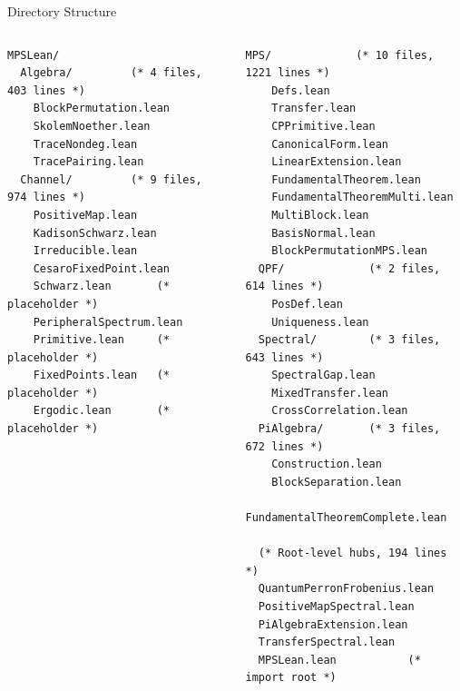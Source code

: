 \documentclass[aspectratio=169,10pt]{beamer}
\begin{document}
\begin{frame}[fragile]{Directory Structure}
    \vspace{-0.3em}
    \begin{columns}[T]
        \begin{lstlisting}[basicstyle=\ttfamily\tiny\color{white},frame=none,backgroundcolor=\color{cardbg}]
MPSLean/
  Algebra/         (* 4 files, 403 lines *)
    BlockPermutation.lean
    SkolemNoether.lean
    TraceNondeg.lean
    TracePairing.lean
  Channel/         (* 9 files, 974 lines *)
    PositiveMap.lean
    KadisonSchwarz.lean
    Irreducible.lean
    CesaroFixedPoint.lean
    Schwarz.lean       (* placeholder *)
    PeripheralSpectrum.lean
    Primitive.lean     (* placeholder *)
    FixedPoints.lean   (* placeholder *)
    Ergodic.lean       (* placeholder *)
        \end{lstlisting}

        \begin{lstlisting}[basicstyle=\ttfamily\tiny\color{white},frame=none,backgroundcolor=\color{cardbg}]
  MPS/             (* 10 files, 1221 lines *)
    Defs.lean
    Transfer.lean
    CPPrimitive.lean
    CanonicalForm.lean
    LinearExtension.lean
    FundamentalTheorem.lean
    FundamentalTheoremMulti.lean
    MultiBlock.lean
    BasisNormal.lean
    BlockPermutationMPS.lean
  QPF/             (* 2 files, 614 lines *)
    PosDef.lean
    Uniqueness.lean
  Spectral/        (* 3 files, 643 lines *)
    SpectralGap.lean
    MixedTransfer.lean
    CrossCorrelation.lean
  PiAlgebra/       (* 3 files, 672 lines *)
    Construction.lean
    BlockSeparation.lean
    FundamentalTheoremComplete.lean

  (* Root-level hubs, 194 lines *)
  QuantumPerronFrobenius.lean
  PositiveMapSpectral.lean
  PiAlgebraExtension.lean
  TransferSpectral.lean
  MPSLean.lean           (* import root *)
        \end{lstlisting}
    \end{columns}
\end{frame}
\end{document}
